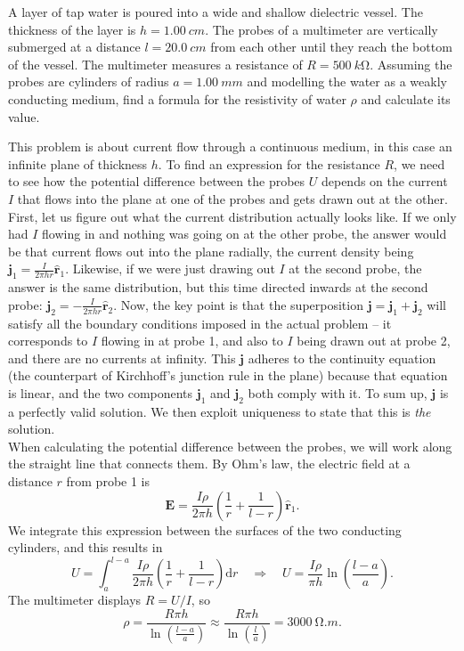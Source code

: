 \documentclass[../TST.tex]{subfiles}
\begin{document}
\begin{pproblem}
A layer of tap water is poured into a wide and shallow dielectric vessel. The thickness of the layer is $h=\qty{1.00}{cm}$. The probes of a multimeter are vertically submerged at a distance $l=\qty{20.0}{cm}$ from each other until they reach the bottom of the vessel. The multimeter measures a resistance of $R=\qty{500}{k\ohm}$. Assuming the probes are cylinders of radius $a=\qty{1.00}{mm}$ and modelling the water as a weakly conducting medium, find a formula for the resistivity of water $\rho$ and calculate its value.
\end{pproblem}
\ifprob \else
\begin{solution} 
	This problem is about current flow through a continuous medium, in this case an infinite plane of thickness $h$. To find an expression for the resistance $R$, we need to see how the potential difference between the probes $U$ depends on the current $I$ that flows into the plane at one of the probes and gets drawn out at the other.\\[5pt]
	First, let us figure out what the current distribution actually looks like. If we only had $I$ flowing in and nothing was going on at the other probe, the answer would be that current flows out into the plane radially, the current density being $\mathbf{j}_1=\frac{I}{2\pi hr}\hat{\mathbf{r}}_1$. Likewise, if we were just drawing out $I$ at the second probe, the answer is the same distribution, but this time directed inwards at the second probe: $\mathbf{j}_2=-\frac{I}{2\pi hr}\hat{\mathbf{r}}_2$. Now, the key point is that the superposition $\mathbf{j}=\mathbf{j}_1+\mathbf{j}_2$ will satisfy all the boundary conditions imposed in the actual problem -- it corresponds to $I$ flowing in at probe 1, and also to $I$ being drawn out at probe 2, and there are no currents at infinity. This $\mathbf{j}$ adheres to the continuity equation (the counterpart of Kirchhoff's junction rule in the plane) because that equation is linear, and the two components $\mathbf{j}_1$ and $\mathbf{j}_2$ both comply with it. To sum up, $\mathbf{j}$ is a perfectly valid solution. We then exploit uniqueness to state that this is \textit{the} solution. \\[5pt]
	When calculating the potential difference between the probes, we will work along the straight line that connects them. By Ohm's law, the electric field at a distance $r$ from probe 1 is
	\begin{equation*}
	\mathbf{E}=\frac{I\rho}{2\pi h}\left(\frac{1}{r}+\frac{1}{l-r}\right) \hat{\mathbf{r}}_1
	.
	\end{equation*}
We integrate this expression between the surfaces of the two conducting cylinders, and this results in
\begin{equation*}
	U=\int_a^{l-a}\frac{I\rho}{2\pi h}\left(\frac{1}{r}+\frac{1}{l-r}\right) \mathrm{d}r \quad\Rightarrow\quad U=\frac{I\rho}{\pi h}\ln{\left(\frac{l-a}{a}\right) }
.
\end{equation*}
The multimeter displays $R=U/I$, so 
\begin{equation*}
	\rho = \frac{R \pi h}{\ln{\left(\frac{l-a}{a}\right) }}\approx \boxed{\frac{\!R\pi h}{\ln\left(\frac{l}{a}\right)}=\qty{3000}{\ohm.m}.}
\end{equation*}

\end{solution} 
\fi
\end{document}
